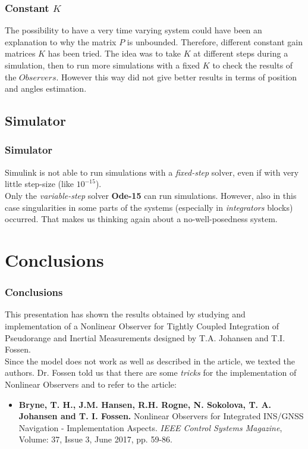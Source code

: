 \documentclass{beamer}
\begin{document}
	\begin{frame}
		\frametitle{Constant $K$}
		The possibility to have a very time varying system could have been an explanation to why the matrix $P$ is unbounded. Therefore, different constant gain matrices $K$ has been tried. The idea was to take $K$ at different steps during a simulation, then to run more simulations with a fixed $K$ to check the results of the $Observers$. However this way did not give better results in terms of position and angles estimation.
	\end{frame}
	
\subsection{Simulator}
	\begin{frame}
		\frametitle{Simulator}
		Simulink is not able to run simulations with a \textit{fixed-step} solver, even if with very little step-size (like $10^{-15}$).\\
		Only the \textit{variable-step} solver \textbf{Ode-15} can run simulations. However, also in this case singularities in some parts of the systems (especially in \textit{integrators} blocks) occurred.
		That makes us thinking again about a no-well-posedness system.
		
	\end{frame}
	
	\section{Conclusions}
		\begin{frame}
		\frametitle{Conclusions}
		This presentation has shown the results obtained by studying and implementation
		of a Nonlinear Observer for Tightly Coupled Integration of Pseudorange and Inertial Measurements
		designed by T.A. Johansen and T.I. Fossen.\\
		
		Since the model does not work as well as described in the article, we texted the authors. Dr. Fossen told us that there are some \textit{tricks} for the implementation of Nonlinear Observers and to refer to the article:
		\begin{itemize}
			\item \textbf{Bryne, T. H., J.M. Hansen, R.H. Rogne, N. Sokolova, T. A. Johansen and T. I. Fossen. } Nonlinear Observers for Integrated INS/GNSS Navigation - Implementation Aspects. \textit{IEEE Control Systems Magazine}, Volume: 37, Issue 3, June 2017, pp. 59-86.
		\end{itemize} 
		\end{frame}
		
\end{document}
